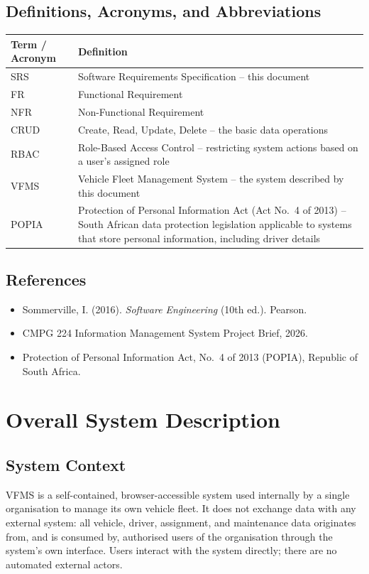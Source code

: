 \documentclass[11pt,a4paper]{article}
\begin{document}
\subsection{Definitions, Acronyms, and Abbreviations}
\begin{longtable}{@{}p{3.2cm}p{11.3cm}@{}}
\toprule
Term / Acronym & Definition \\
\midrule
\endhead
SRS & Software Requirements Specification -- this document \\
FR & Functional Requirement \\
NFR & Non-Functional Requirement \\
CRUD & Create, Read, Update, Delete -- the basic data operations \\
RBAC & Role-Based Access Control -- restricting system actions based on
a user's assigned role \\
VFMS & Vehicle Fleet Management System -- the system described by this
document \\
POPIA & Protection of Personal Information Act (Act No.\ 4 of 2013) --
South African data protection legislation applicable to systems that
store personal information, including driver details \\
\bottomrule
\end{longtable}

\subsection{References}
\begin{itemize}
  \item Sommerville, I. (2016). \textit{Software Engineering} (10th ed.).
  Pearson.
  \item CMPG 224 Information Management System Project Brief, 2026.
  \item Protection of Personal Information Act, No.\ 4 of 2013 (POPIA),
  Republic of South Africa.
\end{itemize}

\section{Overall System Description}

\subsection{System Context}
VFMS is a self-contained, browser-accessible system used internally by a
single organisation to manage its own vehicle fleet. It does not exchange
data with any external system: all vehicle, driver, assignment, and
maintenance data originates from, and is consumed by, authorised users of
the organisation through the system's own interface. Users interact with
the system directly; there are no automated external actors.
\end{document}

